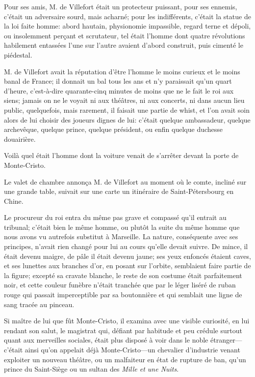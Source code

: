 Pour ses amis, M. de Villefort était un protecteur puissant, pour ses ennemis, c'était un adversaire sourd, mais acharné; pour les indifférents, c'était la statue de la loi faite homme: abord hautain, physionomie impassible, regard terne et dépoli, ou insolemment perçant et scrutateur, tel était l'homme dont quatre révolutions habilement entassées l'une sur l'autre avaient d'abord construit, puis cimenté le piédestal. 

M. de Villefort avait la réputation d'être l'homme le moins curieux et le moins banal de France; il donnait un bal tous les ans et n'y paraissait qu'un quart d'heure, c'est-à-dire quarante-cinq minutes de moins que ne le fait le roi aux siens; jamais on ne le voyait ni aux théâtres, ni aux concerts, ni dans aucun lieu public, quelquefois, mais rarement, il faisait une partie de whist, et l'on avait soin alors de lui choisir des joueurs dignes de lui: c'était quelque ambassadeur, quelque archevêque, quelque prince, quelque président, ou enfin quelque duchesse douairière. 

Voilà quel était l'homme dont la voiture venait de s'arrêter devant la porte de Monte-Cristo. 

Le valet de chambre annonça M. de Villefort au moment où le comte, incliné sur une grande table, suivait sur une carte un itinéraire de Saint-Pétersbourg en Chine. 

Le procureur du roi entra du même pas grave et compassé qu'il entrait au tribunal; c'était bien le même homme, ou plutôt la suite du même homme que nous avons vu autrefois substitut à Marseille. La nature, conséquente avec ses principes, n'avait rien changé pour lui au cours qu'elle devait suivre. De mince, il était devenu maigre, de pâle il était devenu jaune; ses yeux enfoncés étaient caves, et ses lunettes aux branches d'or, en posant sur l'orbite, semblaient faire partie de la figure; excepté sa cravate blanche, le reste de son costume était parfaitement noir, et cette couleur funèbre n'était tranchée que par le léger liséré de ruban rouge qui passait imperceptible par sa boutonnière et qui semblait une ligne de sang tracée au pinceau. 

Si maître de lui que fût Monte-Cristo, il examina avec une visible curiosité, en lui rendant son salut, le magistrat qui, défiant par habitude et peu crédule surtout quant aux merveilles sociales, était plus disposé à voir dans le noble étranger—c'était ainsi qu'on appelait déjà Monte-Cristo—un chevalier d'industrie venant exploiter un nouveau théâtre, ou un malfaiteur en état de rupture de ban, qu'un prince du Saint-Siège ou un sultan des \textit{Mille et une Nuits}. 

